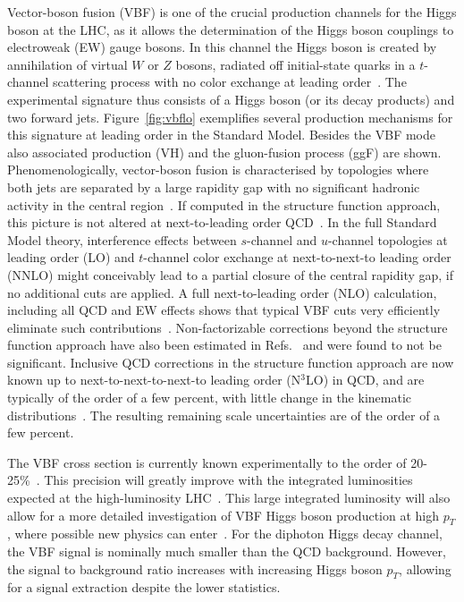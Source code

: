 \documentclass[10pt,prd,fleqn,superscriptaddress,notitlepage,nofootinbib,preprintnumbers,nobalancelastpage]{revtex4-1}
\newcommand{\VBF}{VBF\xspace}
\newcommand{\VH}{VH\xspace}
\begin{document}
Vector-boson fusion (\VBF) is one of the crucial production channels for the Higgs boson at the LHC,
as it allows the determination of the Higgs boson couplings to electroweak (EW) gauge bosons.
In this channel the Higgs boson is created by annihilation of virtual $W$ or $Z$
bosons, radiated off initial-state quarks in a $t$-channel scattering process
with no color exchange at leading order~\cite{Cahn:1983ip,Kane:1984bb}.
The experimental signature thus consists of a Higgs boson (or its decay
products) and two forward jets.
Figure~\ref{fig:vbflo} exemplifies several production mechanisms for this
signature at leading order in the Standard Model. Besides the VBF mode also associated
production (\VH) and the gluon-fusion process (ggF) are shown.
Phenomenologically, vector-boson fusion is  characterised by topologies where both jets are
separated by a large rapidity gap with no significant hadronic activity in
the central region~\cite{Rainwater:1997dg,Rainwater:1998kj,Rainwater:1999sd,
  Plehn:1999nw,Eboli:2000ze}.
If computed in the structure function approach, this picture is not altered
at next-to-leading order QCD~\cite{Han:1992hr,Figy:2003nv,Bolzoni:2010xr}.
In the full Standard Model theory, interference effects between $s$-channel and $u$-channel
topologies at leading order (LO) and $t$-channel color exchange at next-to-next-to leading order
(NNLO) might conceivably lead to a partial closure of the central rapidity gap, if no additional cuts are applied.
A full next-to-leading order (NLO) calculation, including all QCD and EW effects shows that typical
\VBF cuts very efficiently eliminate such contributions~\cite{Ciccolini:2007jr,Ciccolini:2007ec}.
Non-factorizable corrections beyond the structure function approach have
also been estimated in Refs.~\cite{Liu:2019tuy,Dreyer:2020urf} and were found to not be significant.
Inclusive QCD corrections in the structure function approach are now known up to
next-to-next-to-next-to leading order (N$^3$LO) in QCD,
and are typically of the order of a few percent, with little change in the
kinematic distributions~\cite{Dreyer:2016oyx}. The resulting remaining scale uncertainties
are of the order of a few percent.

The \VBF cross section is currently known experimentally to the order of 20-25\%~\cite{ATLAS-CONF-2020-027,Sirunyan:2021ybb}.
This precision will greatly improve with the integrated luminosities expected at the high-luminosity LHC~\cite{HL-HE-LHC}. This large integrated luminosity will also allow for a more detailed investigation of \VBF Higgs boson production at high $p_T$, where possible new physics can enter~\cite{Greljo:2015sla,Araz:2020zyh}.
For the diphoton Higgs decay channel, the VBF signal is nominally much smaller than the QCD  background. However, the signal to background ratio increases with increasing Higgs boson $p_T$, allowing for a signal extraction despite the lower statistics.
\end{document}
